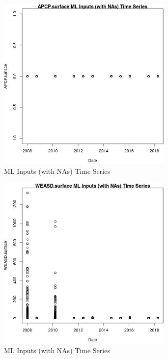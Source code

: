 \begin{figure} 
\centering  
\includegraphics[width=0.77\textwidth]{Code_Outputs/Report_ML_input_PM25_Step4_part_e_de_duplicated_aves_compiled_2019-05-18wNAs_APCPsurfacevDate.jpg} 
\caption{\label{fig:Report_ML_input_PM25_Step4_part_e_de_duplicated_aves_compiled_2019-05-18wNAsAPCPsurfacevDate}ML Inputs (with NAs) Time Series} 
\end{figure} 
 

\begin{figure} 
\centering  
\includegraphics[width=0.77\textwidth]{Code_Outputs/Report_ML_input_PM25_Step4_part_e_de_duplicated_aves_compiled_2019-05-18wNAs_WEASDsurfacevDate.jpg} 
\caption{\label{fig:Report_ML_input_PM25_Step4_part_e_de_duplicated_aves_compiled_2019-05-18wNAsWEASDsurfacevDate}ML Inputs (with NAs) Time Series} 
\end{figure} 
 


